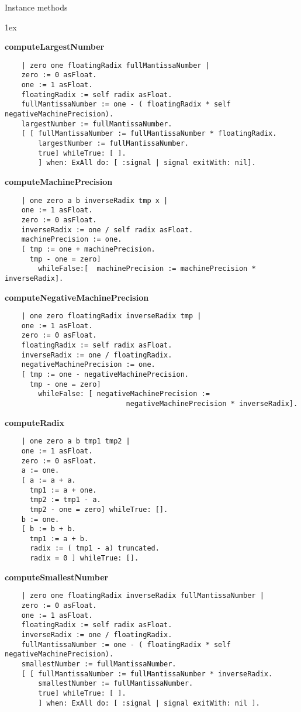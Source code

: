 Instance methods
{\parskip 1ex\par\noindent}
{\bf computeLargestNumber}
\begin{verbatim}
    | zero one floatingRadix fullMantissaNumber |
    zero := 0 asFloat.
    one := 1 asFloat.
    floatingRadix := self radix asFloat.
    fullMantissaNumber := one - ( floatingRadix * self negativeMachinePrecision).
    largestNumber := fullMantissaNumber.
    [ [ fullMantissaNumber := fullMantissaNumber * floatingRadix.
        largestNumber := fullMantissaNumber.
        true] whileTrue: [ ].
        ] when: ExAll do: [ :signal | signal exitWith: nil].
\end{verbatim}
{\bf computeMachinePrecision}
\begin{verbatim}
    | one zero a b inverseRadix tmp x |
    one := 1 asFloat.
    zero := 0 asFloat.
    inverseRadix := one / self radix asFloat.
    machinePrecision := one.
    [ tmp := one + machinePrecision.
      tmp - one = zero]
        whileFalse:[  machinePrecision := machinePrecision * inverseRadix].
\end{verbatim}
{\bf computeNegativeMachinePrecision}
\begin{verbatim}
    | one zero floatingRadix inverseRadix tmp |
    one := 1 asFloat.
    zero := 0 asFloat.
    floatingRadix := self radix asFloat.
    inverseRadix := one / floatingRadix.
    negativeMachinePrecision := one.
    [ tmp := one - negativeMachinePrecision.
      tmp - one = zero]
        whileFalse: [ negativeMachinePrecision := 
                             negativeMachinePrecision * inverseRadix].
\end{verbatim}
{\bf computeRadix}
\begin{verbatim}
    | one zero a b tmp1 tmp2 |
    one := 1 asFloat.
    zero := 0 asFloat.
    a := one.
    [ a := a + a.
      tmp1 := a + one.
      tmp2 := tmp1 - a.
      tmp2 - one = zero] whileTrue: [].
    b := one.
    [ b := b + b.
      tmp1 := a + b.
      radix := ( tmp1 - a) truncated.
      radix = 0 ] whileTrue: [].
\end{verbatim}
{\bf computeSmallestNumber}
\begin{verbatim}
    | zero one floatingRadix inverseRadix fullMantissaNumber |
    zero := 0 asFloat.
    one := 1 asFloat.
    floatingRadix := self radix asFloat.
    inverseRadix := one / floatingRadix.
    fullMantissaNumber := one - ( floatingRadix * self negativeMachinePrecision).
    smallestNumber := fullMantissaNumber.
    [ [ fullMantissaNumber := fullMantissaNumber * inverseRadix.
        smallestNumber := fullMantissaNumber.
        true] whileTrue: [ ].
        ] when: ExAll do: [ :signal | signal exitWith: nil ].
\end{verbatim}
